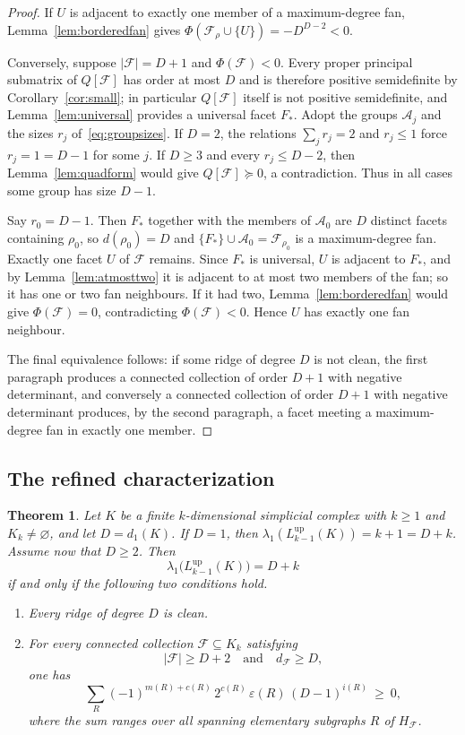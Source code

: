 \documentclass[11pt,reqno]{amsart}
\numberwithin{equation}{section}
\theoremstyle{plain}
\newtheorem{theorem}{Theorem}[section]
\theoremstyle{definition}
\newcommand{\Lup}{L^{\mathrm{up}}}
\newcommand{\eps}{\varepsilon}
\newcommand{\Aset}{\mathcal A}
\newcommand{\Fset}{\mathcal F}
\begin{document}
\begin{proof}
If $U$ is adjacent to exactly one member of a maximum-degree fan, Lemma~\ref{lem:borderedfan} gives
$\Phi(\Fset_\rho\cup\{U\})=-D^{D-2}<0$.

Conversely, suppose $|\Fset|=D+1$ and $\Phi(\Fset)<0$. Every proper principal submatrix of
$Q[\Fset]$ has order at most $D$ and is therefore positive semidefinite by
Corollary~\ref{cor:small}; in particular $Q[\Fset]$ itself is not positive semidefinite, and
Lemma~\ref{lem:universal} provides a universal facet $F_*$. Adopt the groups $\Aset_j$ and the
sizes $r_j$ of~\eqref{eq:groupsizes}. If $D=2$, the relations $\sum_j r_j=2$ and $r_j\le1$ force
$r_j=1=D-1$ for some $j$. If $D\ge3$ and every $r_j\le D-2$, then Lemma~\ref{lem:quadform} would
give $Q[\Fset]\succeq0$, a contradiction. Thus in all cases some group has size $D-1$.

Say $r_0=D-1$. Then $F_*$ together with the members of $\Aset_0$ are $D$ distinct facets
containing $\rho_0$, so $d(\rho_0)=D$ and $\{F_*\}\cup\Aset_0=\Fset_{\rho_0}$ is a
maximum-degree fan. Exactly one facet $U$ of $\Fset$ remains. Since $F_*$ is universal, $U$ is
adjacent to $F_*$, and by Lemma~\ref{lem:atmosttwo} it is adjacent to at most two members of the
fan; so it has one or two fan neighbours. If it had two, Lemma~\ref{lem:borderedfan} would give
$\Phi(\Fset)=0$, contradicting $\Phi(\Fset)<0$. Hence $U$ has exactly one fan neighbour.

The final equivalence follows: if some ridge of degree $D$ is not clean, the first paragraph
produces a connected collection of order $D+1$ with negative determinant, and conversely a
connected collection of order $D+1$ with negative determinant produces, by the second paragraph,
a facet meeting a maximum-degree fan in exactly one member.
\end{proof}

\subsection{The refined characterization}

\begin{theorem}\label{thm:refined}
Let $K$ be a finite $k$-dimensional simplicial complex with $k\ge1$ and $K_k\ne\varnothing$, and
let $D=d_1(K)$. If $D=1$, then $\lambda_1(\Lup_{k-1}(K))=k+1=D+k$. Assume now that
$D\ge2$. Then
\[
  \lambda_1\bigl(\Lup_{k-1}(K)\bigr)=D+k
\]
if and only if the following two conditions hold.
\begin{enumerate}[label=\textup{(\roman*)},leftmargin=2.6em,itemsep=0.3em]
\item\label{it:ref-i} Every ridge of degree $D$ is clean.
\item\label{it:ref-ii} For every connected collection $\Fset\subseteq K_k$ satisfying
\[
  |\Fset|\ge D+2\quad\text{and}\quad d_{\Fset}\ge D ,
\]
one has
\[
  \sum_R {(-1)}^{m(R)+c(R)}\,2^{c(R)}\,\eps(R)\,{(D-1)}^{i(R)}\ \ge\ 0,
\]
where the sum ranges over all spanning elementary subgraphs $R$ of $H_{\Fset}$.
\end{enumerate}
\end{theorem}
\end{document}
